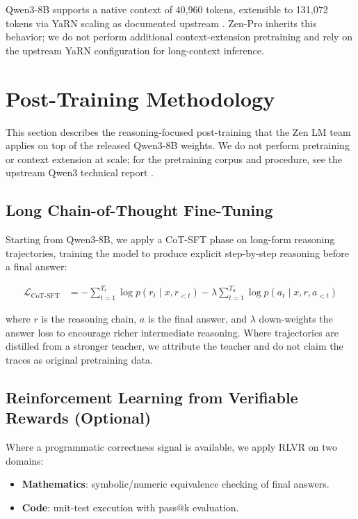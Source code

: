 \documentclass[11pt,a4paper]{article}
\begin{document}
Qwen3-8B supports a native context of 40{,}960 tokens, extensible to 131{,}072 tokens via YaRN
scaling \cite{peng2023yarn} as documented upstream \cite{qwen3report}. Zen-Pro inherits this
behavior; we do not perform additional context-extension pretraining and rely on the upstream YaRN
configuration for long-context inference.

\section{Post-Training Methodology}

This section describes the reasoning-focused post-training that the Zen LM team applies on top of the
released Qwen3-8B weights. We do not perform pretraining or context extension at scale; for the
pretraining corpus and procedure, see the upstream Qwen3 technical report \cite{qwen3report}.

\subsection{Long Chain-of-Thought Fine-Tuning}

Starting from Qwen3-8B, we apply a CoT-SFT phase on long-form reasoning trajectories, training the
model to produce explicit step-by-step reasoning before a final answer:

\begin{align}
  \mathcal{L}_{\text{CoT-SFT}} &= -\sum_{t=1}^{T_r} \log p(r_t \mid x, r_{<t})
                                   - \lambda \sum_{t=1}^{T_a} \log p(a_t \mid x, r, a_{<t})
\end{align}

where $r$ is the reasoning chain, $a$ is the final answer, and $\lambda$ down-weights the answer
loss to encourage richer intermediate reasoning. Where trajectories are distilled from a stronger
teacher, we attribute the teacher and do not claim the traces as original pretraining data.

\subsection{Reinforcement Learning from Verifiable Rewards (Optional)}

Where a programmatic correctness signal is available, we apply RLVR \cite{lightman2023lets,
cobbe2021gsm8k} on two domains:

\begin{itemize}
  \item \textbf{Mathematics}: symbolic/numeric equivalence checking of final answers.
  \item \textbf{Code}: unit-test execution with pass@k evaluation.
\end{itemize}
\end{document}
